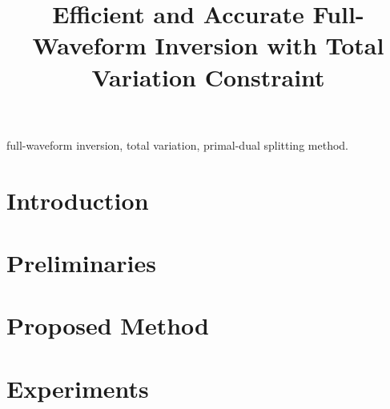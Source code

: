 \documentclass[conference,a4paper]{IEEEtran}
\begin{document}
	

	\title{Efficient and Accurate Full-Waveform Inversion with Total Variation Constraint}


	\author{

		\and


		\and

	}


	\maketitle
	\begin{abstract}  \end{abstract}

	\begin{IEEEkeywords} full-waveform inversion, total variation, primal-dual splitting method. \end{IEEEkeywords}

	\section{Introduction}      \label{sec:Introduction}    

	\section{Preliminaries}     \label{sec:Preliminaries}   

	\section{Proposed Method}   \label{sec:ProposedMethod}  

	\section{Experiments}       \label{sec:Experiments}     
\end{document}
